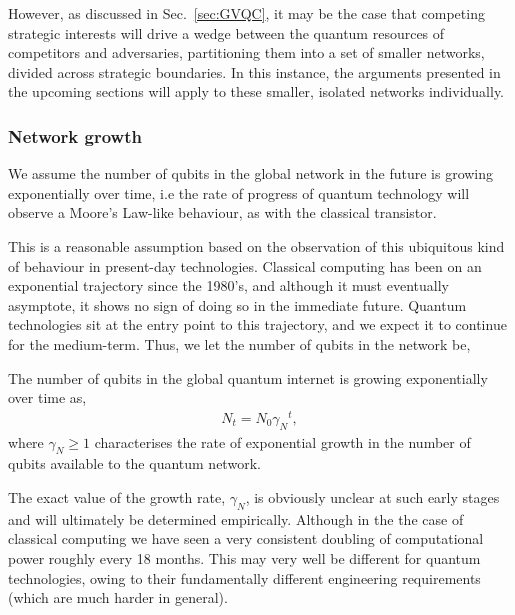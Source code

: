 However, as discussed in Sec.~\ref{sec:GVQC}, it may be the case that competing strategic interests will drive a wedge between the quantum resources of competitors and adversaries, partitioning them into a set of smaller networks, divided across strategic boundaries. In this instance, the arguments presented in the upcoming sections will apply to these smaller, isolated networks individually.

%
%

\subsubsection{Network growth} 

We assume the number of qubits in the global network in the future is growing exponentially over time, i.e the rate of progress of quantum technology will observe a Moore's Law-like behaviour, as with the classical transistor.

This is a reasonable assumption based on the observation of this ubiquitous kind of behaviour in present-day technologies. Classical computing has been on an exponential trajectory since the 1980's, and although it must eventually asymptote, it shows no sign of doing so in the immediate future. Quantum technologies sit at the entry point to this trajectory, and we expect it to continue for the medium-term. Thus, we let the number of qubits in the network be,
\begin{postulate}\label{post:net_growth}
The number of qubits in the global quantum internet is growing exponentially over time as,
\begin{align}
	N_t = N_0 {\gamma_N}^{t},
\end{align}
where \mbox{$\gamma_N\geq 1$} characterises the rate of exponential growth in the number of qubits available to the quantum network.
\end{postulate}

The exact value of the growth rate, $\gamma_N$, is obviously unclear at such early stages and will ultimately be determined empirically. Although in the the case of classical computing we have seen a very consistent doubling of computational power roughly every 18 months. This may very well be different for quantum technologies, owing to their fundamentally different engineering requirements (which are much harder in general).

%
%

